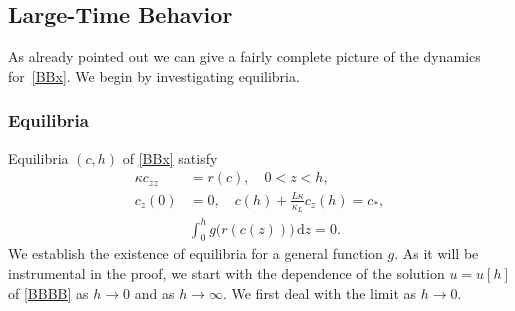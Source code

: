 \documentclass[reqno,11pt]{amsart}
\numberwithin{equation}{section}
\newcommand{\rd}{\mathrm{d}}
\begin{document}
\subsection{Large-Time Behavior}

As already pointed out we can give a fairly complete picture of the dynamics for~\eqref{BBx}. We begin by investigating  equilibria.


\subsubsection{Equilibria}


Equilibria $(c,h)$ of \eqref{BBx} satisfy
\begin{subequations}\label{BBex}
\begin{align}
\kappa c_{zz}&= r(c),\quad 0<z<h,\label{BBex2}\\
c_z(0)&=0,\quad c(h)+\frac{L\kappa}{\kappa_L}c_z(h)=c_*, \label{BBex4}\\
&\int_0^h g\big(r(c(z))\big)\,\rd z=0. \label{BBex6}
\end{align}
 \end{subequations}
We establish the existence of equilibria for a general function
$g$. As it will be instrumental in the proof, we start with the
dependence of the solution $u=u[h]$ of \eqref{BBBB} as $h\to 0$ and as
$h\to \infty$.  We first deal with the limit as $h\to 0$.
\end{document}
